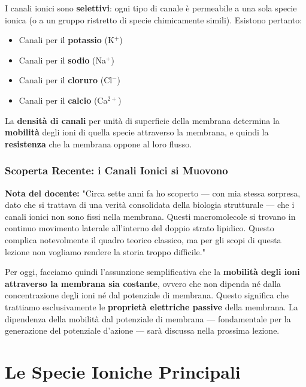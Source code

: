 I canali ionici sono \textbf{selettivi}: ogni tipo di canale è permeabile a una sola specie ionica (o a un gruppo ristretto di specie chimicamente simili). Esistono pertanto:

\begin{itemize}
    \item Canali per il \textbf{potassio} (K$^+$)
    \item Canali per il \textbf{sodio} (Na$^+$)
    \item Canali per il \textbf{cloruro} (Cl$^-$)
    \item Canali per il \textbf{calcio} (Ca$^{2+}$)
\end{itemize}

La \textbf{densità di canali} per unità di superficie della membrana determina la \textbf{mobilità} degli ioni di quella specie attraverso la membrana, e quindi la \textbf{resistenza} che la membrana oppone al loro flusso.

\subsubsection{Scoperta Recente: i Canali Ionici si Muovono}

\begin{tcolorbox}[colback=gray!5, colframe=gray!40, arc=2mm, boxrule=0.5pt]
\textbf{Nota del docente:} "Circa sette anni fa ho scoperto — con mia stessa sorpresa, dato che si trattava di una verità consolidata della biologia strutturale — che i canali ionici non sono fissi nella membrana. Questi macromolecole si trovano in continuo movimento laterale all'interno del doppio strato lipidico. Questo complica notevolmente il quadro teorico classico, ma per gli scopi di questa lezione non vogliamo rendere la storia troppo difficile."
\end{tcolorbox}

Per oggi, facciamo quindi l'assunzione semplificativa che la \textbf{mobilità degli ioni attraverso la membrana sia costante}, ovvero che non dipenda né dalla concentrazione degli ioni né dal potenziale di membrana. Questo significa che trattiamo esclusivamente le \textbf{proprietà elettriche passive} della membrana. La dipendenza della mobilità dal potenziale di membrana — fondamentale per la generazione del potenziale d'azione — sarà discussa nella prossima lezione.


\section{Le Specie Ioniche Principali}

